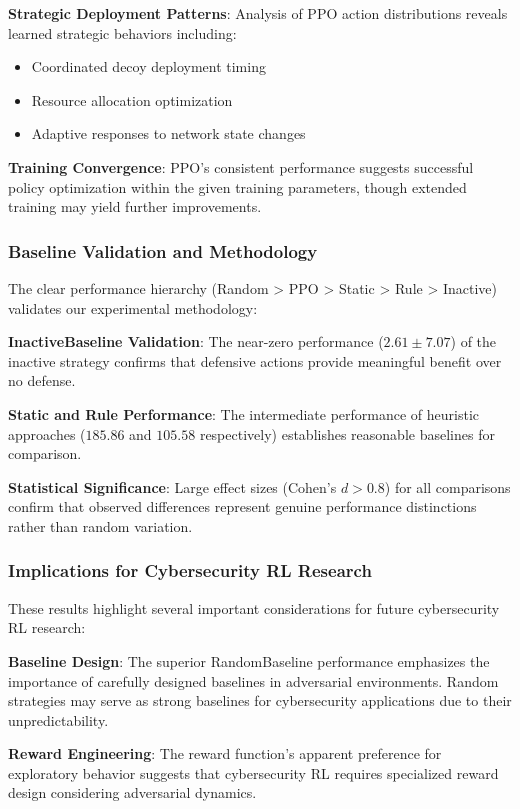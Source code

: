 \documentclass[12pt,oneside]{article}
\begin{document}
\textbf{Strategic Deployment Patterns}: Analysis of PPO action distributions reveals learned strategic behaviors including:
\begin{itemize}
    \item Coordinated decoy deployment timing
    \item Resource allocation optimization
    \item Adaptive responses to network state changes
\end{itemize}

\textbf{Training Convergence}: PPO's consistent performance suggests successful policy optimization within the given training parameters, though extended training may yield further improvements.

\subsubsection{Baseline Validation and Methodology}

The clear performance hierarchy (Random > PPO > Static > Rule > Inactive) validates our experimental methodology:

\textbf{InactiveBaseline Validation}: The near-zero performance ($2.61 \pm 7.07$) of the inactive strategy confirms that defensive actions provide meaningful benefit over no defense.

\textbf{Static and Rule Performance}: The intermediate performance of heuristic approaches ($185.86$ and $105.58$ respectively) establishes reasonable baselines for comparison.

\textbf{Statistical Significance}: Large effect sizes (Cohen's $d > 0.8$) for all comparisons confirm that observed differences represent genuine performance distinctions rather than random variation.

\subsubsection{Implications for Cybersecurity RL Research}

These results highlight several important considerations for future cybersecurity RL research:

\textbf{Baseline Design}: The superior RandomBaseline performance emphasizes the importance of carefully designed baselines in adversarial environments. Random strategies may serve as strong baselines for cybersecurity applications due to their unpredictability.

\textbf{Reward Engineering}: The reward function's apparent preference for exploratory behavior suggests that cybersecurity RL requires specialized reward design considering adversarial dynamics.
\end{document}
